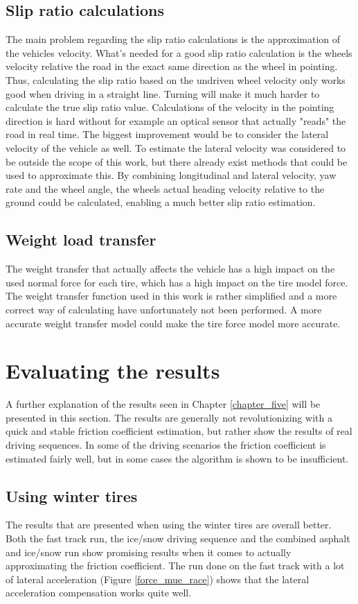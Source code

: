\subsection{Slip ratio calculations}
The main problem regarding the slip ratio calculations is the approximation of the vehicles velocity. What's needed for a good slip ratio calculation is the wheels velocity relative the road in the exact same direction as the wheel in pointing. Thus, calculating the slip ratio based on the undriven wheel velocity only works good when driving in a straight line. Turning will make it much harder to calculate the true slip ratio value. Calculations of the velocity in the pointing direction is hard without for example an optical sensor that actually "reads" the road in real time. The biggest improvement would be to consider the lateral velocity of the vehicle as well. To estimate the lateral velocity was considered to be outside the scope of this work, but there already exist methods that could be used to approximate this. By combining longitudinal and lateral velocity, yaw rate and the wheel angle, the wheels actual heading velocity relative to the ground could be calculated, enabling a much better slip ratio estimation.

\subsection{Weight load transfer}
The weight transfer that actually affects the vehicle has a high impact on the used normal force for each tire, which has a high impact on the tire model force. The weight transfer function used in this work is rather simplified and a more correct way of calculating have unfortunately not been performed. A more accurate weight transfer model could make the tire force model more accurate.   

\section{Evaluating the results}
A further explanation of the results seen in Chapter \ref{chapter_five} will be presented in this section. The results are generally not revolutionizing with a quick and stable friction coefficient estimation, but rather show the results of real driving sequences. In some of the driving scenarios the friction coefficient is estimated fairly well, but in some cases the algorithm is shown to be insufficient. 

\subsection{Using winter tires}
The results that are presented when using the winter tires are overall better. Both the fast track run, the ice/snow driving sequence and the combined asphalt and ice/snow run show promising results when it comes to actually approximating the friction coefficient. The run done on the fast track with a lot of lateral acceleration (Figure \ref{force_mue_race}) shows that the lateral acceleration compensation works quite well.

